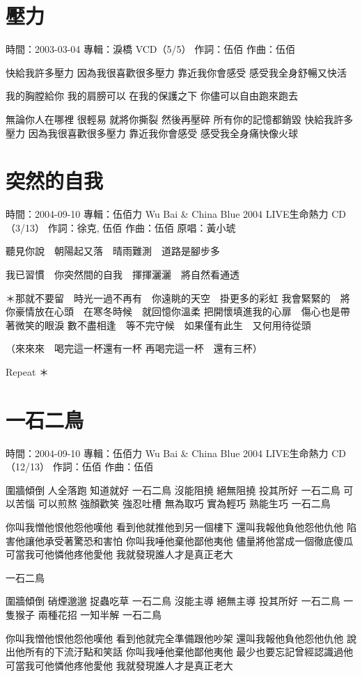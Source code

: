 \documentclass[UTF8,a4paper,oneside,twocolumn,12pt]{ctexbook}
\newcommand{\infopair}[2]{\textbullet #1：#2}
\newcommand{\zc}[1][伍佰]{\infopair{作詞}{#1}}
\newcommand{\zq}[1][伍佰]{\infopair{作曲}{#1}}
\newcommand{\zj}[1]{\infopair{專輯}{#1}}
\newcommand{\yc}[1]{\infopair{原唱}{#1}}
\newcommand{\sj}[1]{\infopair{時間}{#1}}
\newenvironment{info}{\begin{flushleft}\kaishu
	}
	{\end{flushleft}\normalsize\yahei\par}
\newenvironment{lyric}{
	}
{}
\begin{document}
\section{壓力}
\begin{info}
	\sj{2003-03-04}
	\zj{淚橋 VCD（5/5）}
	\zc
	\zq
\end{info}
\begin{lyric}
	快給我許多壓力
	因為我很喜歡很多壓力
	靠近我你會感受
	感受我全身舒暢又快活

	我的胸膛給你
	我的肩膀可以
	在我的保護之下
	你儘可以自由跑來跑去

	無論你人在哪裡
	很輕易
	就將你撕裂
	然後再壓碎
	所有你的記憶都銷毀
	快給我許多壓力
	因為我很喜歡很多壓力
	靠近我你會感受
	感受我全身痛快像火球
\end{lyric}

\section{突然的自我}
\begin{info}
	\sj{2004-09-10}
	\zj{伍佰力 Wu Bai \& China Blue 2004 LIVE生命熱力 CD（3/13）}
	\zc[徐克, 伍佰]
	\zq
	\yc{黃小琥}
\end{info}
\begin{lyric}
	聽見你說　朝陽起又落　晴雨難測　道路是腳步多

	我已習慣　你突然間的自我　揮揮灑灑　將自然看通透

	＊那就不要留　時光一過不再有　你遠眺的天空　掛更多的彩虹
	我會緊緊的　將你豪情放在心頭　在寒冬時候　就回憶你溫柔
	把開懷填進我的心扉　傷心也是帶著微笑的眼淚
	數不盡相逢　等不完守候　如果僅有此生　又何用待從頭

	（來來來　喝完這一杯還有一杯
	再喝完這一杯　還有三杯）

	Repeat ＊
\end{lyric}

\section{一石二鳥}
\begin{info}
	\sj{2004-09-10}
	\zj{伍佰力 Wu Bai \& China Blue 2004 LIVE生命熱力 CD（12/13）}
	\zc
	\zq
\end{info}
\begin{lyric}
	圍牆傾倒 人全落跑
	知道就好 一石二鳥
	沒能阻撓 絕無阻撓
	投其所好 一石二鳥
	可以苦惱 可以煎熬
	強顏歡笑 強忍吐槽
	無為取巧 實為輕巧
	熟能生巧 一石二鳥

	你叫我憎他恨他怨他嘆他
	看到他就推他到另一個樓下
	還叫我報他負他怨他仇他
	陷害他讓他承受著驚恐和害怕
	你叫我唾他棄他鄙他夷他
	儘量將他當成一個徹底傻瓜
	可當我可他憐他疼他愛他
	我就發現誰人才是真正老大

	一石二鳥

	圍牆傾倒 硝煙邈邈
	捉蟲吃草 一石二鳥
	沒能主導 絕無主導
	投其所好 一石二鳥
	一隻猴子 兩種花招
	一知半解 一石二鳥

	你叫我憎他恨他怨他嘆他
	看到他就完全準備跟他吵架
	還叫我報他負他怨他仇他
	說出他所有的下流汙點和笑話
	你叫我唾他棄他鄙他夷他
	最少也要忘記曾經認識過他
	可當我可他憐他疼他愛他
	我就發現誰人才是真正老大
\end{lyric}
\end{document}
